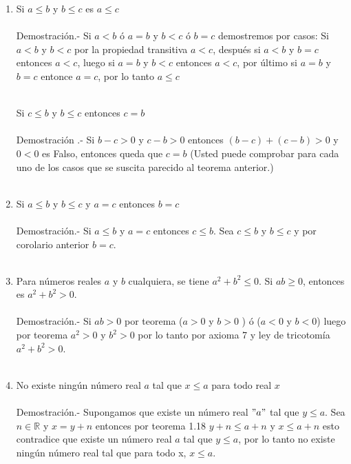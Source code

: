\begin{enumerate}[\bfseries  1.]
\item Si $a \leq b $ y $b \leq c$ es $a\leq c$\\\\
Demostración.- \; Si $a<b$ ó $a=b$ y $b<c$ ó $b=c$ demostremos por casos: Si $a<b$ y $b<c$ por la propiedad transitiva $a<c$, después si $a<b$ y $b=c$ entonces $a<c$, luego si $a=b$ y $b<c$ entonces $a<c$,  por último si $a=b$ y $b=c$ entonce $a=c$, por lo tanto $a\leq c$\\\\

\begin{cor}
Si $c\leq b$ y $b \leq c$ entonces $c=b$\\\\
Demostración .- \; Si $b-c>0$ y $c-b>0$ entonces $(b-c)+(c-b)>0$ y $0<0$ es Falso, entonces queda que $c=b$ (Usted puede comprobar para cada uno de los casos que se suscita parecido al teorema anterior.)\\\\
\end{cor}

\item Si $a\leq b$ y $b \leq c$ y $a=c$ entonces $b=c$\\\\
Demostración.- \; Si $a\leq b$\;  y \; $a=c$ entonces $c\leq b$. Sea $c\leq b$ \; y \; $b\leq c$ y por corolario anterior \; $b=c$.\\\\

\item Para números reales $a$ y $b$ cualquiera, se tiene $a^2+b^2\leq 0$. Si $ab\geq 0$, entonces es $a^2+b^2>0$.\\\\
Demostración.- \; Si $ab>0$ por teorema  ($a>0$ y $b>0$ ) ó ($a<0$ y $b<0$) luego por teorema  $a^2>0$ y $b^2>0$ por lo tanto por axioma 7 y ley de tricotomía $a^2+b^2>0$.\\\\ 

\item No existe ningún número real $a$ tal que $x\leq a$ para todo real $x$\\\\
Demostración.- \; Supongamos que existe un número real $" a "$ tal que $y \leq a$. Sea $n\in \mathbb{R}$ \; y \; $x=y+n$ entonces por teorema 1.18 \; $y+n \leq a+n$ \; y \; $x\leq a+n$ esto contradice que existe un número real $a$ tal que $y\leq a$, por lo tanto no existe ningún número real tal que para todo x, $x\leq a$.\\\\


\end{enumerate}
